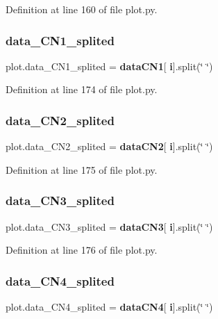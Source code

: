 Definition at line 160 of file plot.\+py.

\mbox{\label{namespaceplot_a11b670d0fca5cade1f3db107c42e4629}} 
\subsubsection{data\+\_\+\+C\+N1\+\_\+splited}
{\footnotesize\ttfamily plot.\+data\+\_\+\+C\+N1\+\_\+splited = \textbf{ data\+C\+N1}[\textbf{ i}].split(\char`\"{} \char`\"{})}



Definition at line 174 of file plot.\+py.

\mbox{\label{namespaceplot_a91507414e72a817569b1cdeb03b2139b}} 
\subsubsection{data\+\_\+\+C\+N2\+\_\+splited}
{\footnotesize\ttfamily plot.\+data\+\_\+\+C\+N2\+\_\+splited = \textbf{ data\+C\+N2}[\textbf{ i}].split(\char`\"{} \char`\"{})}



Definition at line 175 of file plot.\+py.

\mbox{\label{namespaceplot_af356e2610504e4caca6097012489252c}} 
\subsubsection{data\+\_\+\+C\+N3\+\_\+splited}
{\footnotesize\ttfamily plot.\+data\+\_\+\+C\+N3\+\_\+splited = \textbf{ data\+C\+N3}[\textbf{ i}].split(\char`\"{} \char`\"{})}



Definition at line 176 of file plot.\+py.

\mbox{\label{namespaceplot_a294087612741d18714dcf58aaf5cc57f}} 
\subsubsection{data\+\_\+\+C\+N4\+\_\+splited}
{\footnotesize\ttfamily plot.\+data\+\_\+\+C\+N4\+\_\+splited = \textbf{ data\+C\+N4}[\textbf{ i}].split(\char`\"{} \char`\"{})}



